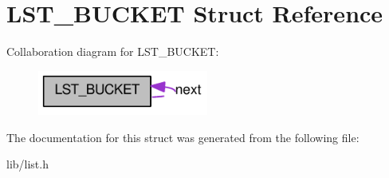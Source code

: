 \hypertarget{structLST__BUCKET}{
\section{LST\_\-BUCKET Struct Reference}
\label{structLST__BUCKET}
}


Collaboration diagram for LST\_\-BUCKET:\nopagebreak
\begin{figure}[H]
\begin{center}
\leavevmode
\includegraphics[width=159pt]{structLST__BUCKET__coll__graph}
\end{center}
\end{figure}


The documentation for this struct was generated from the following file:\begin{DoxyCompactItemize}
\item 
lib/list.h\end{DoxyCompactItemize}
